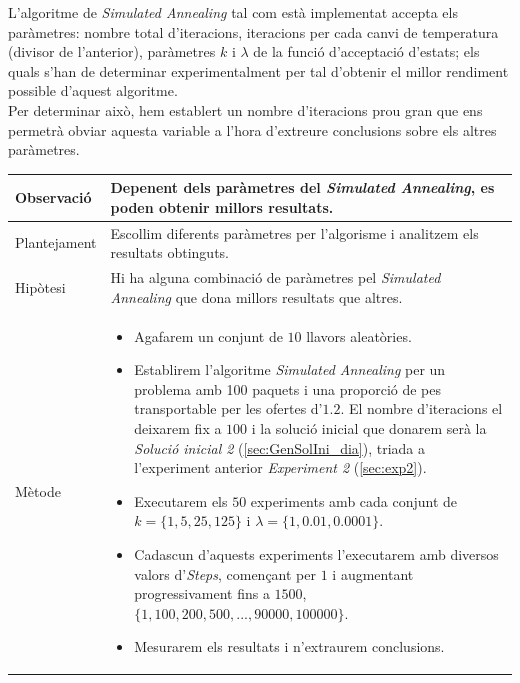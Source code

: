 \documentclass[a4paper]{article}
\begin{document}
	L'algoritme de \textit{Simulated Annealing} tal com està implementat accepta els paràmetres: nombre total d'iteracions, iteracions per cada canvi de temperatura (divisor de l'anterior), paràmetres $k$ i $\lambda$ de la funció d'acceptació d'estats; els quals s'han de determinar experimentalment per tal d'obtenir el millor rendiment possible d'aquest algoritme.\\
	
	Per determinar això, hem establert un nombre d'iteracions prou gran que ens permetrà obviar aquesta variable a l'hora d'extreure conclusions sobre els altres paràmetres.

	\begin{table}[ht]
		\centering
		\begin{tabular}{|l|p{10cm}|}
			\hline
			Observació & Depenent dels paràmetres del \textit{Simulated Annealing}, es poden obtenir millors resultats. \\
			\hline
			Plantejament & Escollim diferents paràmetres per l'algorisme i analitzem els resultats obtinguts. \\
			\hline
			Hipòtesi & Hi ha alguna combinació de paràmetres pel \textit{Simulated Annealing} que dona millors resultats que altres.\\
			\hline
			Mètode &
			\begin{itemize}
				\item Agafarem un conjunt de $10$ llavors aleatòries.
				\item Establirem l'algoritme \textit{Simulated Annealing} per un problema amb 100 paquets i una proporció de pes transportable per les ofertes d'$1.2$. El nombre d'iteracions el deixarem fix a $100$ i la solució inicial que donarem serà la \textit{Solució inicial 2} (\ref{sec:GenSolIni_dia}), triada a l'experiment anterior \textit{Experiment 2} (\ref{sec:exp2}).
				\item Executarem els $50$ experiments amb cada conjunt de $k=\{1, 5, 25, 125\}$ i $\lambda = \{1, 0.01, 0.0001\}$.
				\item Cadascun d'aquests experiments l'executarem amb diversos valors d'\textit{Steps}, començant per $1$ i augmentant progressivament fins a $1500$, $\{1, 100, 200, 500, ... , 90000, 100000\}$. 
				\item Mesurarem els resultats i n'extraurem conclusions.
			\end{itemize} \\
			\hline
		\end{tabular}
		\label{tab:exp3_apartats}
	\end{table}
	
\end{document}
